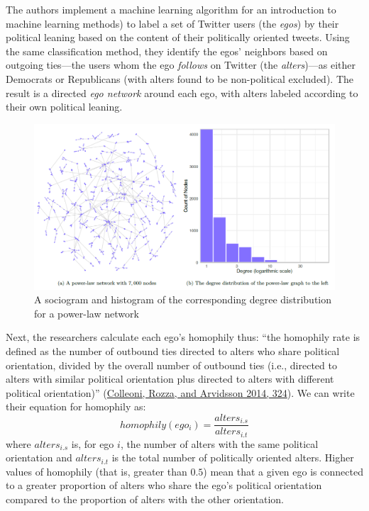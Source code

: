 \documentclass{book}
\begin{document}
The authors implement a machine learning algorithm for an introduction to
machine learning methods) to label a set of Twitter users (the \emph{egos}) by
their political leaning based on the content of their politically oriented
tweets. Using the same classification method, they identify the egos'
neighbors based on outgoing ties---the users whom the ego \emph{follows} on
Twitter (the \emph{alters})---as either Democrats or Republicans (with alters
found to be non-political excluded). The result is a directed \emph{ego
network} around each ego, with alters labeled according to their own political
leaning.

\begin{figure}
\centering
\includegraphics{images/social-networks/11-14.png}
\caption{A sociogram and histogram of the corresponding degree distribution
for a power-law network}
\end{figure}

Next, the researchers calculate each ego's homophily thus: ``the homophily
rate is defined as the number of outbound ties directed to alters who share
political orientation, divided by the overall number of outbound ties (i.e.,
directed to alters with similar political orientation plus directed to alters
with different political orientation)''
(\protect\hyperlink{ref-ColleoniEtAl2014}{Colleoni, Rozza, and Arvidsson 2014,
324}). We can write their equation for homophily as:
\[homophily(ego_i) = \frac{alters_{i.s}}{alters_{i.t}}\] where
\(alters_{i.s}\) is, for ego \(i\), the number of alters with the same
political orientation and \(alters_{i.t}\) is the total number of politically
oriented alters. Higher values of homophily (that is, greater than \(0.5\))
mean that a given ego is connected to a greater proportion of alters who share
the ego's political orientation compared to the proportion of alters with the
other orientation.
\end{document}
